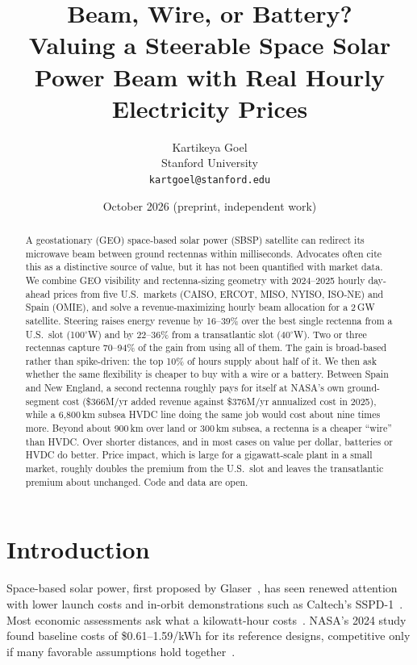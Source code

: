 \documentclass[11pt]{article}
\title{Beam, Wire, or Battery?\\[4pt]\large Valuing a Steerable Space Solar Power Beam with Real Hourly Electricity Prices}
\author{Kartikeya Goel\\Stanford University\\\texttt{kartgoel@stanford.edu}}
\date{October 2026 \quad (preprint, independent work)}
\begin{document}
\maketitle

\begin{abstract}
A geostationary (GEO) space-based solar power (SBSP) satellite can redirect its microwave beam between ground
rectennas within milliseconds. Advocates often cite this as a distinctive source of value, but it has not been
quantified with market data. We combine GEO visibility and rectenna-sizing geometry with 2024--2025 hourly
day-ahead prices from five U.S.\ markets (CAISO, ERCOT, MISO, NYISO, ISO-NE) and Spain (OMIE), and solve a
revenue-maximizing hourly beam allocation for a 2\,GW satellite. Steering raises energy revenue by 16--39\% over
the best single rectenna from a U.S.\ slot (100$^\circ$W) and by 22--36\% from a transatlantic slot (40$^\circ$W).
Two or three rectennas capture 70--94\% of the gain from using all of them. The gain is broad-based rather than spike-driven: the top 10\%
of hours supply about half of it. We then ask whether the same flexibility is cheaper to buy with a wire or a battery.
Between Spain and New England, a second rectenna roughly pays for itself at NASA's own ground-segment cost
(\$366M/yr added revenue against \$376M/yr annualized cost in 2025), while a 6,800\,km subsea HVDC line doing the
same job would cost about nine times more. Beyond about 900\,km over land or 300\,km subsea, a rectenna is a cheaper
``wire'' than HVDC. Over shorter distances, and in most cases on value per dollar, batteries or HVDC do better.
Price impact, which is large for a gigawatt-scale plant in a small market, roughly doubles the premium from the U.S.\ slot and leaves the transatlantic premium about unchanged.
Code and data are open.
\end{abstract}

\section{Introduction}
Space-based solar power, first proposed by Glaser~\cite{glaser1968}, has seen renewed attention with lower launch
costs and in-orbit demonstrations such as Caltech's SSPD-1~\cite{caltech2023}. Most economic assessments ask what a
kilowatt-hour costs~\cite{nasa2024,caltechjoule2025,niebla2025}. NASA's 2024 study found baseline costs of
\$0.61--1.59/kWh for its reference designs, competitive only if many favorable assumptions hold together~\cite{nasa2024}.
\end{document}
